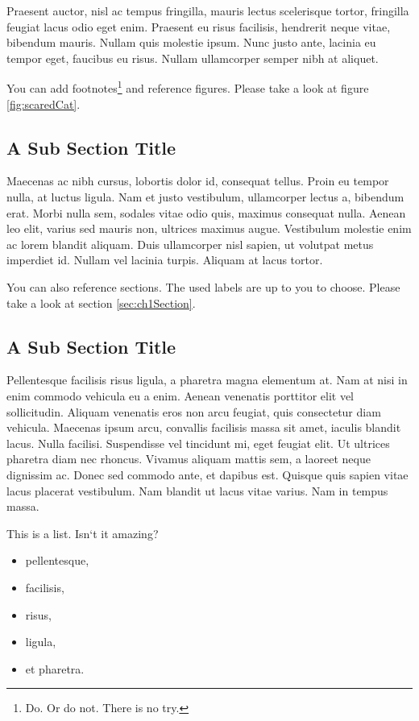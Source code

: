 Praesent auctor, nisl ac tempus fringilla, mauris lectus scelerisque tortor, fringilla feugiat lacus odio eget enim. Praesent eu risus facilisis, hendrerit neque vitae, bibendum mauris. Nullam quis molestie ipsum. Nunc justo ante, lacinia eu tempor eget, faucibus eu risus. Nullam ullamcorper semper nibh at aliquet.

\smallskip
You can add footnotes\footnote{Do. Or do not. There is no try.} and reference figures. Please take a look at figure \ref{fig:scaredCat}.

\subsection{A Sub Section Title}

Maecenas ac nibh cursus, lobortis dolor id, consequat tellus. Proin eu tempor nulla, at luctus ligula. Nam et justo vestibulum, ullamcorper lectus a, bibendum erat. Morbi nulla sem, sodales vitae odio quis, maximus consequat nulla. Aenean leo elit, varius sed mauris non, ultrices maximus augue. Vestibulum molestie enim ac lorem blandit aliquam. Duis ullamcorper nisl sapien, ut volutpat metus imperdiet id. Nullam vel lacinia turpis. Aliquam at lacus tortor.

\bigskip
You can also reference sections. The used labels are up to you to choose. Please take a look at section \ref{sec:ch1Section}.

\subsection{A Sub Section Title}

Pellentesque facilisis risus ligula, a pharetra magna elementum at. Nam at nisi in enim commodo vehicula eu a enim. Aenean venenatis porttitor elit vel sollicitudin. Aliquam venenatis eros non arcu feugiat, quis consectetur diam vehicula. Maecenas ipsum arcu, convallis facilisis massa sit amet, iaculis blandit lacus. Nulla facilisi. Suspendisse vel tincidunt mi, eget feugiat elit. Ut ultrices pharetra diam nec rhoncus. Vivamus aliquam mattis sem, a laoreet neque dignissim ac. Donec sed commodo ante, et dapibus est. Quisque quis sapien vitae lacus placerat vestibulum. Nam blandit ut lacus vitae varius. Nam in tempus massa.

\bigskip
This is a list. Isn`t it amazing?

\begin{itemize}
  \item pellentesque,
  \item facilisis,
  \item risus,
  \item ligula,
  \item et pharetra.
\end{itemize}